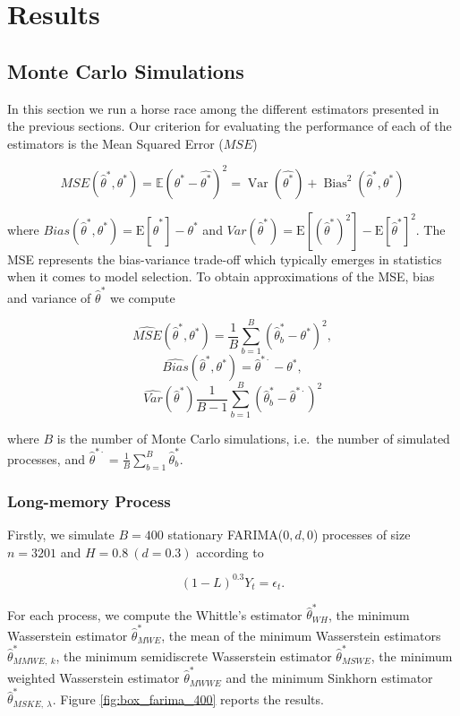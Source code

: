 \documentclass[
  11pt,
]{article}
\begin{document}
\hypertarget{results}{%
\section{Results}\label{results}}

\hypertarget{monte-carlo-simulations}{%
\subsection{Monte Carlo Simulations}\label{monte-carlo-simulations}}

In this section we run a horse race among the different estimators
presented in the previous sections. Our criterion for evaluating the
performance of each of the estimators is the Mean Squared Error
(\(MSE\))

\[MSE(\hat \theta^*, \theta^*) = \mathbb{E}(\theta^*-\hat{\theta^*})^{2} = \operatorname{Var}(\hat{\theta^*})+\operatorname{Bias}^{2}(\hat \theta^*, \theta^*)\]

where
\(Bias(\hat \theta^*, \theta^*) = \mathrm{E}[\hat \theta^*] - \theta^*\)
and
\(Var( \hat \theta^*) = \mathrm{E}[(\hat \theta^*)^2]-\mathrm{E}[\hat \theta^*]^{2}\).
The MSE represents the bias-variance trade-off which typically emerges
in statistics when it comes to model selection. To obtain approximations
of the MSE, bias and variance of \(\hat \theta^*\) we compute

\[\widehat{MSE}(\hat \theta^*, \theta^*) =  \frac{1}{B}\sum_{b = 1}^{B}(\hat \theta^*_b - \theta^*)^2,\]
\[\widehat{Bias}(\hat \theta^*, \theta^*) = \hat \theta^{* \cdot} - \theta^*,\]
\[\widehat{Var}( \hat \theta^*) \frac{1}{B - 1} \sum^{B}_{b = 1}(\hat \theta^*_b - \hat \theta^{* \cdot})^2\]

where \(B\) is the number of Monte Carlo simulations, i.e.~the number of
simulated processes, and
\(\hat \theta^{* \cdot} = \frac{1}{B} \sum^B_{b = 1} \hat \theta^*_b\).

\hypertarget{long-memory-process}{%
\subsubsection{Long-memory Process}\label{long-memory-process}}

Firstly, we simulate \(B = 400\) stationary FARIMA(\(0,d,0\)) processes
of size \(n = 3201\) and \(H = 0.8 \ (d = 0.3)\) according to

\[(1-L)^{0.3}Y_t = \epsilon_t.\]

For each process, we compute the Whittle's estimator
\(\hat \theta^*_{WH}\), the minimum Wasserstein estimator
\(\hat \theta^*_{MWE}\), the mean of the minimum Wasserstein estimators
\(\hat \theta^*_{MMWE, \ k}\), the minimum semidiscrete Wasserstein
estimator \(\hat \theta^*_{MSWE}\), the minimum weighted Wasserstein
estimator \(\hat \theta^*_{MWWE}\) and the minimum Sinkhorn estimator
\(\hat \theta^*_{MSKE,\ \lambda}\). Figure \ref{fig:box_farima_400}
reports the results.
\end{document}
